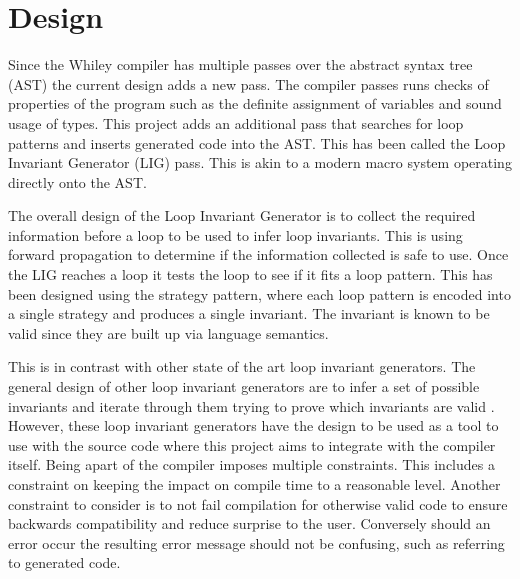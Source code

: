 \chapter{Design}\label{C:design}
%

Since the Whiley compiler has multiple passes over the abstract syntax tree
(AST)
the current design adds a new pass. The compiler passes runs checks of properties
of the program such as the definite assignment of variables and sound usage of
types. This project adds an additional pass that searches for loop patterns and
inserts generated code into the AST.
This has been called the Loop Invariant Generator (LIG) pass.
This is akin to a modern macro system operating directly onto the AST.

The overall design of the Loop Invariant Generator is to collect the required
information before a loop to be used to infer loop invariants.
This is using forward propagation to determine if the
information collected is safe to use. Once the LIG reaches a loop
it tests the loop to see if it fits a loop pattern. This has been
designed using the strategy pattern, where each loop pattern is encoded
into a single strategy and produces a single invariant.
The invariant is known to be valid since they are built up via language
semantics.

This is in contrast with other state of the art loop invariant generators.
The general design of other loop invariant generators are to infer a set
of possible invariants and iterate through them trying to prove which
invariants are valid \cite{infer-dynamic} \cite{infer-postconditions}.
However, these loop invariant generators have the design to be used as a tool
to use with the source code where this project aims to integrate with the
compiler itself. Being apart of the compiler imposes multiple constraints.
This includes a constraint on keeping the impact on compile time to a
reasonable level.
Another constraint to consider is to not fail compilation for otherwise valid
code to ensure backwards compatibility and reduce surprise to the user.
Conversely should an error occur the resulting error message should not be
confusing, such as referring to generated code.

